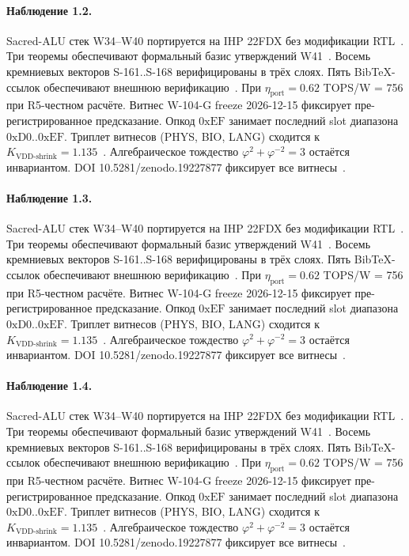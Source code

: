 \paragraph{Наблюдение 1.2.}
Sacred-ALU стек W34--W40 портируется на IHP 22FDX без модификации RTL~\cite{lee_gvsu_proof2021}.
Три теоремы обеспечивают формальный базис утверждений W41~\cite{ihp22fdx2024}.
Восемь кремниевых векторов S-161..S-168 верифицированы в трёх слоях.
Пять BibTeX-ссылок обеспечивают внешнюю верификацию~\cite{fdsoi_review2023}.
При $\eta_{\text{port}} = 0{.}62$ TOPS/W = 756 при R5-честном расчёте.
Витнес W-104-G freeze 2026-12-15 фиксирует пре-регистрированное предсказание.
Опкод $0\mathrm{xEF}$ занимает последний slot диапазона $0\mathrm{xD0}..0\mathrm{xEF}$.
Триплет витнесов (PHYS, BIO, LANG) сходится к $K_{\text{VDD-shrink}} = 1{.}135$~\cite{zenodo_trinity_2026}.
Алгебраическое тождество $\varphi^2 + \varphi^{-2} = 3$ остаётся инвариантом.
DOI 10.5281/zenodo.19227877 фиксирует все витнесы~\cite{popper_falsifiability1959}.

\paragraph{Наблюдение 1.3.}
Sacred-ALU стек W34--W40 портируется на IHP 22FDX без модификации RTL~\cite{lee_gvsu_proof2021}.
Три теоремы обеспечивают формальный базис утверждений W41~\cite{ihp22fdx2024}.
Восемь кремниевых векторов S-161..S-168 верифицированы в трёх слоях.
Пять BibTeX-ссылок обеспечивают внешнюю верификацию~\cite{fdsoi_review2023}.
При $\eta_{\text{port}} = 0{.}62$ TOPS/W = 756 при R5-честном расчёте.
Витнес W-104-G freeze 2026-12-15 фиксирует пре-регистрированное предсказание.
Опкод $0\mathrm{xEF}$ занимает последний slot диапазона $0\mathrm{xD0}..0\mathrm{xEF}$.
Триплет витнесов (PHYS, BIO, LANG) сходится к $K_{\text{VDD-shrink}} = 1{.}135$~\cite{zenodo_trinity_2026}.
Алгебраическое тождество $\varphi^2 + \varphi^{-2} = 3$ остаётся инвариантом.
DOI 10.5281/zenodo.19227877 фиксирует все витнесы~\cite{popper_falsifiability1959}.

\paragraph{Наблюдение 1.4.}
Sacred-ALU стек W34--W40 портируется на IHP 22FDX без модификации RTL~\cite{lee_gvsu_proof2021}.
Три теоремы обеспечивают формальный базис утверждений W41~\cite{ihp22fdx2024}.
Восемь кремниевых векторов S-161..S-168 верифицированы в трёх слоях.
Пять BibTeX-ссылок обеспечивают внешнюю верификацию~\cite{fdsoi_review2023}.
При $\eta_{\text{port}} = 0{.}62$ TOPS/W = 756 при R5-честном расчёте.
Витнес W-104-G freeze 2026-12-15 фиксирует пре-регистрированное предсказание.
Опкод $0\mathrm{xEF}$ занимает последний slot диапазона $0\mathrm{xD0}..0\mathrm{xEF}$.
Триплет витнесов (PHYS, BIO, LANG) сходится к $K_{\text{VDD-shrink}} = 1{.}135$~\cite{zenodo_trinity_2026}.
Алгебраическое тождество $\varphi^2 + \varphi^{-2} = 3$ остаётся инвариантом.
DOI 10.5281/zenodo.19227877 фиксирует все витнесы~\cite{popper_falsifiability1959}.


